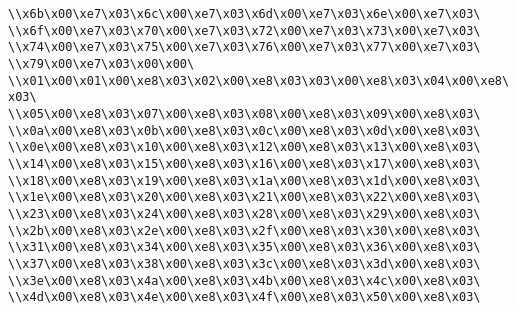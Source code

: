 \verb|\\x6b\x00\xe7\x03\x6c\x00\xe7\x03\x6d\x00\xe7\x03\x6e\x00\xe7\x03\|\newline
\verb|\\x6f\x00\xe7\x03\x70\x00\xe7\x03\x72\x00\xe7\x03\x73\x00\xe7\x03\|\newline
\verb|\\x74\x00\xe7\x03\x75\x00\xe7\x03\x76\x00\xe7\x03\x77\x00\xe7\x03\|\newline
\verb|\\x79\x00\xe7\x03\x00\x00\|\newline
\verb|\\x01\x00\x01\x00\xe8\x03\x02\x00\xe8\x03\x03\x00\xe8\x03\x04\x00\xe8\x03\|\newline
\verb|\\x05\x00\xe8\x03\x07\x00\xe8\x03\x08\x00\xe8\x03\x09\x00\xe8\x03\|\newline
\verb|\\x0a\x00\xe8\x03\x0b\x00\xe8\x03\x0c\x00\xe8\x03\x0d\x00\xe8\x03\|\newline
\verb|\\x0e\x00\xe8\x03\x10\x00\xe8\x03\x12\x00\xe8\x03\x13\x00\xe8\x03\|\newline
\verb|\\x14\x00\xe8\x03\x15\x00\xe8\x03\x16\x00\xe8\x03\x17\x00\xe8\x03\|\newline
\verb|\\x18\x00\xe8\x03\x19\x00\xe8\x03\x1a\x00\xe8\x03\x1d\x00\xe8\x03\|\newline
\verb|\\x1e\x00\xe8\x03\x20\x00\xe8\x03\x21\x00\xe8\x03\x22\x00\xe8\x03\|\newline
\verb|\\x23\x00\xe8\x03\x24\x00\xe8\x03\x28\x00\xe8\x03\x29\x00\xe8\x03\|\newline
\verb|\\x2b\x00\xe8\x03\x2e\x00\xe8\x03\x2f\x00\xe8\x03\x30\x00\xe8\x03\|\newline
\verb|\\x31\x00\xe8\x03\x34\x00\xe8\x03\x35\x00\xe8\x03\x36\x00\xe8\x03\|\newline
\verb|\\x37\x00\xe8\x03\x38\x00\xe8\x03\x3c\x00\xe8\x03\x3d\x00\xe8\x03\|\newline
\verb|\\x3e\x00\xe8\x03\x4a\x00\xe8\x03\x4b\x00\xe8\x03\x4c\x00\xe8\x03\|\newline
\verb|\\x4d\x00\xe8\x03\x4e\x00\xe8\x03\x4f\x00\xe8\x03\x50\x00\xe8\x03\|\newline
